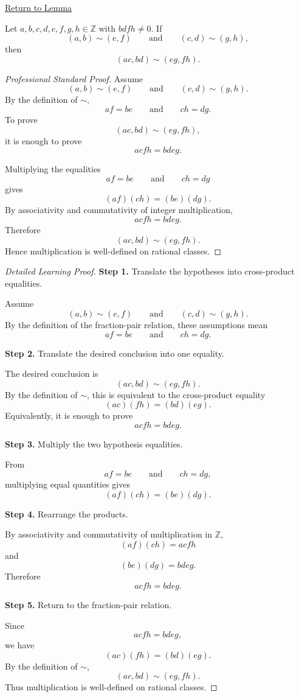 \newpage
{}
\label{prf:rational-multiplication-well-defined}

\begin{remark*}[Return]
\hyperref[lem:rational-multiplication-well-defined]{Return to Lemma}
\end{remark*}

\begin{lemma*}
Let $a,b,c,d,e,f,g,h\in\mathbb{Z}$ with $bdfh\neq 0$. If
\[
(a,b)\sim(e,f)
\qquad\text{and}\qquad
(c,d)\sim(g,h),
\]
then
\[
(ac,bd)\sim(eg,fh).
\]
\end{lemma*}

\begin{proof}[Professional Standard Proof]
\LRAProofBodyStart
Assume
\[
(a,b)\sim(e,f)
\qquad\text{and}\qquad
(c,d)\sim(g,h).
\]
By the definition of $\sim$,
\[
af=be
\qquad\text{and}\qquad
ch=dg.
\]
To prove
\[
(ac,bd)\sim(eg,fh),
\]
it is enough to prove
\[
acfh=bdeg.
\]

Multiplying the equalities
\[
af=be
\qquad\text{and}\qquad
ch=dg
\]
gives
\[
(af)(ch)=(be)(dg).
\]
By associativity and commutativity of integer multiplication,
\[
acfh=bdeg.
\]
Therefore
\[
(ac,bd)\sim(eg,fh).
\]
Hence multiplication is well-defined on rational classes.
\end{proof}

\begin{proof}[Detailed Learning Proof]
\LRAProofBodyStart

\textbf{Step 1.} Translate the hypotheses into cross-product equalities.

Assume
\[
(a,b)\sim(e,f)
\qquad\text{and}\qquad
(c,d)\sim(g,h).
\]
By the definition of the fraction-pair relation, these assumptions mean
\[
af=be
\qquad\text{and}\qquad
ch=dg.
\]

\textbf{Step 2.} Translate the desired conclusion into one equality.

The desired conclusion is
\[
(ac,bd)\sim(eg,fh).
\]
By the definition of $\sim$, this is equivalent to the cross-product equality
\[
(ac)(fh)=(bd)(eg).
\]
Equivalently, it is enough to prove
\[
acfh=bdeg.
\]

\textbf{Step 3.} Multiply the two hypothesis equalities.

From
\[
af=be
\qquad\text{and}\qquad
ch=dg,
\]
multiplying equal quantities gives
\[
(af)(ch)=(be)(dg).
\]

\textbf{Step 4.} Rearrange the products.

By associativity and commutativity of multiplication in $\mathbb{Z}$,
\[
(af)(ch)=acfh
\]
and
\[
(be)(dg)=bdeg.
\]
Therefore
\[
acfh=bdeg.
\]

\textbf{Step 5.} Return to the fraction-pair relation.

Since
\[
acfh=bdeg,
\]
we have
\[
(ac)(fh)=(bd)(eg).
\]
By the definition of $\sim$,
\[
(ac,bd)\sim(eg,fh).
\]
Thus multiplication is well-defined on rational classes.
\end{proof}

